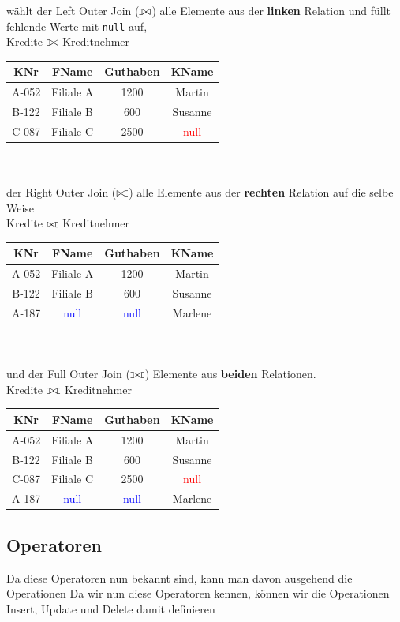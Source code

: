 \documentclass{article}
\def\ojoin{\setbox0=\hbox{$\bowtie$}%
  \rule[-.02ex]{.25em}{.4pt}\llap{\rule[\ht0]{.25em}{.4pt}}}
\def\lojoin{\mathbin{\ojoin\mkern-5.8mu\bowtie}}
\def\rojoin{\mathbin{\bowtie\mkern-5.8mu\ojoin}}
\def\fojoin{\mathbin{\ojoin\mkern-5.8mu\bowtie\mkern-5.8mu\ojoin}}
\begin{document}
 		wählt der Left Outer Join ($\lojoin$) alle Elemente aus der \textbf{linken} Relation und füllt fehlende Werte mit \verb|null| auf, \\
 		Kredite $\lojoin$ Kreditnehmer
 		\begin{tabular}{| c | c | c | c |}
 			\toprule
 			KNr & FName & Guthaben & KName \\ \midrule
 			A-052 & Filiale A & 1200 & Martin \\ \hline
 			B-122 & Filiale B & 600 & Susanne \\ \hline
 			C-087 & Filiale C & 2500 & \textcolor{red}{null} \\
 			\bottomrule
 		\end{tabular} \\ \\
 		der Right Outer Join ($\rojoin$) alle Elemente aus der \textbf{rechten} Relation auf die selbe Weise \\
 		Kredite $\rojoin$ Kreditnehmer
 		\begin{tabular}{| c | c | c | c |}
 			\toprule
 			KNr & FName & Guthaben & KName \\ \midrule
 			A-052 & Filiale A & 1200 & Martin \\ \hline
 			B-122 & Filiale B & 600 & Susanne \\ \hline
 			A-187 & \textcolor{blue}{null} & \textcolor{blue}{null} & Marlene \\
 			\bottomrule
 		\end{tabular} \\ \\
 		und der Full Outer Join ($\fojoin$) Elemente aus \textbf{beiden} Relationen. \\
 		Kredite $\fojoin$ Kreditnehmer
 		\begin{tabular}{| c | c | c | c |}
 			\toprule
 			KNr & FName & Guthaben & KName \\ \midrule
 			A-052 & Filiale A & 1200 & Martin \\ \hline
 			B-122 & Filiale B & 600 & Susanne \\ \hline
 			C-087 & Filiale C & 2500 & \textcolor{red}{null} \\ \hline
 			A-187 & \textcolor{blue}{null} & \textcolor{blue}{null} & Marlene \\
 			\bottomrule
 		\end{tabular}
 	\subsection{Operatoren}
 	Da diese Operatoren nun bekannt sind, kann man davon ausgehend die Operationen
 	Da wir nun diese Operatoren kennen, können wir die Operationen Insert, Update und Delete damit definieren
\end{document}
